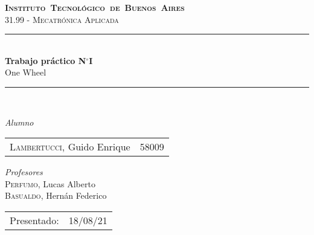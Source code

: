 \begin{titlepage}
\newcommand{\HRule}{\rule{\linewidth}{0.5mm}}
\center
\mbox{\textsc{\LARGE \bfseries {Instituto Tecnológico de Buenos Aires}}}\\[1.5cm]
\textsc{\Large 31.99 -  Mecatrónica Aplicada}\\[0.5cm]


\HRule \\[0.6cm]
{ \Huge \bfseries Trabajo práctico N$^{\circ}$I}\\[0.4cm] 
{\huge One Wheel}\\
\HRule \\[1.5cm]


{\large

\emph{Alumno}\\
\vspace{3px}

\begin{tabular}{lr} 	
\textsc{Lambertucci}, Guido Enrique  & 58009 \\
\end{tabular}

\vspace{20px}

\emph{Profesores}\\

\textsc{Perfumo}, Lucas Alberto\\
\textsc{Basualdo}, Hernán Federico\\




\vspace{3px}

\vspace{100px}

\begin{tabular}{ll}

Presentado: & 18/08/21\\

\end{tabular}

}

\vfill

\end{titlepage}
